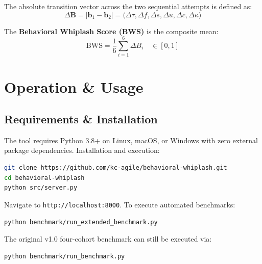 \documentclass[10pt,a4paper]{article}
\begin{document}
The absolute transition vector across the two sequential attempts is defined as:
\begin{equation}
    \Delta \mathbf{B} = |\mathbf{b}_1 - \mathbf{b}_2| = \big(\Delta \tau, \Delta f, \Delta s, \Delta u, \Delta c, \Delta \kappa\big)
\end{equation}

The \textbf{Behavioral Whiplash Score (BWS)} is the composite mean:
\begin{equation}
    \text{BWS} = \frac{1}{6} \sum_{i=1}^{6} \Delta B_i \quad \in [0, 1]
\end{equation}

\section*{Operation \& Usage}

\subsection*{Requirements \& Installation}
The tool requires Python 3.8+ on Linux, macOS, or Windows with zero external package dependencies. Installation and execution:
\begin{lstlisting}[language=bash]
git clone https://github.com/kc-agile/behavioral-whiplash.git
cd behavioral-whiplash
python src/server.py
\end{lstlisting}
Navigate to \texttt{http://localhost:8000}. To execute automated benchmarks:
\begin{lstlisting}[language=bash]
python benchmark/run_extended_benchmark.py
\end{lstlisting}
The original v1.0 four-cohort benchmark can still be executed via:
\begin{lstlisting}[language=bash]
python benchmark/run_benchmark.py
\end{lstlisting}
\end{document}
